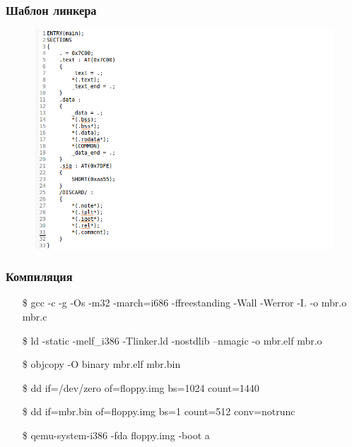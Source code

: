 \documentclass{beamer}
\begin{document}

\begin{frame}
\frametitle{Шаблон линкера}

\begin{figure}
\includegraphics[scale=0.4]{res/linker}
\end{figure}

\end{frame}


\begin{frame}
\frametitle{Компиляция}

\begin{itemize}
\item[\$]gcc -c -g -Os -m32 -march=i686 -ffreestanding -Wall -Werror -I. -o mbr.o mbr.c
\item[\$]ld -static -melf\_i386 -Tlinker.ld -nostdlib --nmagic -o mbr.elf mbr.o
\item[\$]objcopy -O binary mbr.elf mbr.bin
\vspace{3em}
\item[\$]dd if=/dev/zero of=floppy.img bs=1024 count=1440
\item[\$]dd if=mbr.bin of=floppy.img bs=1 count=512 conv=notrunc
\vspace{3em}
\item[\$]qemu-system-i386 -fda floppy.img -boot a
\end{itemize}

\end{frame}

\end{document}
